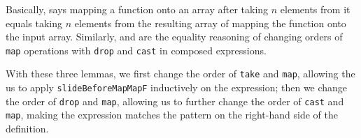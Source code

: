 \documentclass{l4proj}
\begin{document}
Basically,  says mapping a function onto an array after taking $n$ elements from it equals taking $n$ elements from the resulting array of mapping the function onto the input array. Similarly,  and  are the equality reasoning of changing orders of \texttt{map} operations with \texttt{drop} and \texttt{cast} in composed expressions. 

With these three lemmas, we first change the order of \texttt{take} and \texttt{map}, allowing the us to apply \texttt{slideBeforeMapMapF} inductively on the expression; then we change the order of \texttt{drop} and \texttt{map}, allowing us to further change the order of \texttt{cast} and \texttt{map}, making the expression matches the pattern on the right-hand side of the definition.
\end{document}
